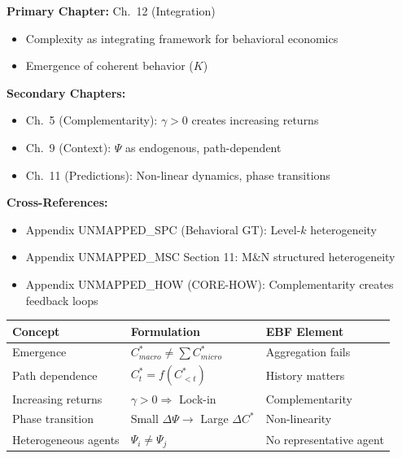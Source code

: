 \begin{tcolorbox}[colback=green!5!white, colframe=green!75!black,
    title=\textbf{Chapter References}]

\textbf{Primary Chapter:} Ch.\ 12 (Integration)
\begin{itemize}[nosep]
    \item Complexity as integrating framework for behavioral economics
    \item Emergence of coherent behavior ($K$)
\end{itemize}

\textbf{Secondary Chapters:}
\begin{itemize}[nosep]
    \item Ch.\ 5 (Complementarity): $\gamma > 0$ creates increasing returns
    \item Ch.\ 9 (Context): $\Psi$ as endogenous, path-dependent
    \item Ch.\ 11 (Predictions): Non-linear dynamics, phase transitions
\end{itemize}

\textbf{Cross-References:}
\begin{itemize}[nosep]
    \item Appendix UNMAPPED_SPC (Behavioral GT): Level-$k$ heterogeneity
    \item Appendix UNMAPPED_MSC Section 11: M\&N structured heterogeneity
    \item Appendix UNMAPPED_HOW (CORE-HOW): Complementarity creates feedback loops
\end{itemize}

\end{tcolorbox}

\begin{tcolorbox}[colback=yellow!5!white, colframe=yellow!75!black,
    title=\textbf{Quick Reference: Key Concepts}]

\renewcommand{\arraystretch}{1.3}
\begin{tabular}{@{}p{4cm}p{5cm}p{4cm}@{}}
\toprule
\textbf{Concept} & \textbf{Formulation} & \textbf{EBF Element} \\
\midrule
Emergence & $C^*_{macro} \neq \sum C^*_{micro}$ & Aggregation fails \\
Path dependence & $C^*_t = f(C^*_{<t})$ & History matters \\
Increasing returns & $\gamma > 0 \Rightarrow$ Lock-in & Complementarity \\
Phase transition & Small $\Delta\Psi \to$ Large $\Delta C^*$ & Non-linearity \\
Heterogeneous agents & $\Psi_i \neq \Psi_j$ & No representative agent \\
\bottomrule
\end{tabular}

\end{tcolorbox}

